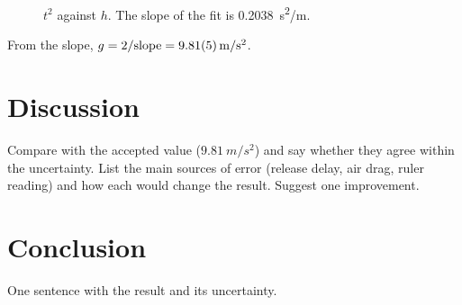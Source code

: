 \documentclass[11pt,a4paper]{article}
\begin{document}
\begin{figure}[ht]
  \centering
  \caption{$t^2$ against $h$. The slope of the fit is \SI{0.2038}{s^2/m}.}
  \label{fig:fit}
\end{figure}

From the slope, $g = 2/\text{slope} = \SI{9.81 \pm 0.05}{m/s^2}$.

\section{Discussion}
Compare with the accepted value ($\SI{9.81}{m/s^2}$) and say whether they agree within
the uncertainty. List the main sources of error (release delay, air drag, ruler reading)
and how each would change the result. Suggest one improvement.

\section{Conclusion}
One sentence with the result and its uncertainty.
\end{document}
